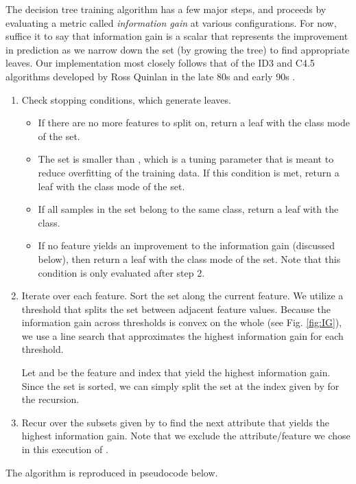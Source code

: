The decision tree training algorithm has a few major steps, and proceeds by evaluating a metric called \emph{information gain} at various configurations. For now, suffice it to say that information gain is a scalar that represents the improvement in prediction as we narrow down the set (by growing the tree) to find appropriate leaves. Our implementation most closely follows that of the ID3 and C4.5 algorithms developed by Ross Quinlan in the late 80s and early 90s \cite{wiki:id3} \cite{wiki:c45}.
%
\begin{enumerate}
\item Check stopping conditions, which generate leaves.
%
  \begin{itemize}
  \item If there are no more features to split on, return a leaf with the class mode of the set. 
  \item The set is smaller than , which is a tuning parameter that is meant to reduce overfitting of the training data. If this condition is met, return a leaf with the class mode of the set.
  \item If all samples in the set belong to the same class, return a leaf with the class.
  \item If no feature yields an improvement to the information gain (discussed below), then return a leaf with the class mode of the set. Note that this condition is only evaluated after step 2. 
  \end{itemize}
\item Iterate over each feature. Sort the set along the current feature. We utilize a threshold that splits the set between adjacent feature values. Because the information gain across thresholds is convex on the whole (see Fig. \ref{fig:IG}), we use a line search that approximates the highest information gain for each threshold. 

  Let  and  be the feature and index that yield the highest information gain. Since the set is sorted, we can simply split the set at the index given by  for the recursion.
\item Recur over the subsets given by  to find the next attribute that yields the highest information gain. Note that we exclude the attribute/feature we chose in this execution of . 
\end{enumerate}

The algorithm is reproduced in pseudocode below.

